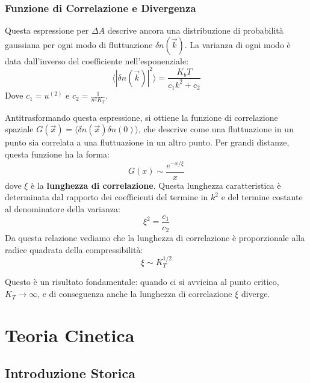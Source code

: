 \subsubsection{Funzione di Correlazione e Divergenza}

Questa espressione per $\Delta A$ descrive ancora una distribuzione di probabilità gaussiana per ogni modo di fluttuazione $\delta n(\vec{k})$. La varianza di ogni modo è data dall'inverso del coefficiente nell'esponenziale:
\begin{equation}
    \langle|\delta n(\vec{k})|^{2}\rangle=\frac{K_{b}T}{c_1 k^{2}+c_2}
    \label{eq:varianza_nk}
\end{equation}
Dove $c_1=u^{(2)}$ e $c_2= \frac{1}{n^2 K_T}$.

Antitrasformando questa espressione, si ottiene la funzione di correlazione spaziale $G(\vec{x}) = \langle \delta n(\vec{x}) \delta n(0) \rangle$, che descrive come una fluttuazione in un punto sia correlata a una fluttuazione in un altro punto. Per grandi distanze, questa funzione ha la forma:
\begin{equation}
    G(x) \sim \frac{e^{-x/\xi}}{x}
    \label{eq:corr_G}
\end{equation}
dove $\xi$ è la \textbf{lunghezza di correlazione}. Questa lunghezza caratteristica è determinata dal rapporto dei coefficienti del termine in $k^2$ e del termine costante al denominatore della varianza:
\begin{equation}
    \xi^{2}=\frac{c_1}{c_2}
    \label{eq:def_xi}
\end{equation}
Da questa relazione vediamo che la lunghezza di correlazione è proporzionale alla radice quadrata della compressibilità:
\begin{equation}
    \xi \sim K_{T}^{1/2}
    \label{eq:xi_KT}
\end{equation}

Questo è un risultato fondamentale: quando ci si avvicina al punto critico, $K_T \rightarrow \infty$, e di conseguenza anche la lunghezza di correlazione $\xi$ diverge.

\section{Teoria Cinetica}

\subsection*{Introduzione Storica}

